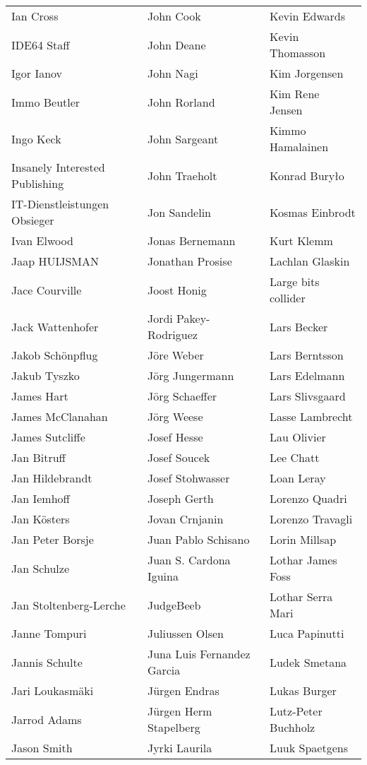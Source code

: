 \begin{tabular}{p{4.5cm}p{4.5cm}p{4.5cm}}
Ian Cross & John Cook & Kevin Edwards \\
IDE64 Staff & John Deane & Kevin Thomasson \\
Igor Ianov & John Nagi & Kim Jorgensen \\
Immo Beutler & John Rorland & Kim Rene Jensen \\
Ingo Keck & John Sargeant & Kimmo Hamalainen \\
Insanely Interested Publishing & John Traeholt & Konrad Buryło \\
IT-Dienstleistungen Obsieger & Jon Sandelin & Kosmas Einbrodt \\
Ivan Elwood & Jonas Bernemann & Kurt Klemm \\
Jaap HUIJSMAN & Jonathan Prosise & Lachlan Glaskin \\
Jace Courville & Joost Honig & Large bits collider \\
Jack Wattenhofer & Jordi Pakey-Rodriguez & Lars Becker \\
Jakob Schönpflug & Jöre Weber & Lars Berntsson \\
Jakub Tyszko & Jörg Jungermann & Lars Edelmann \\
James Hart & Jörg Schaeffer & Lars Slivsgaard \\
James McClanahan & Jörg Weese & Lasse Lambrecht \\
James Sutcliffe & Josef Hesse & Lau Olivier \\
Jan Bitruff & Josef Soucek & Lee Chatt \\
Jan Hildebrandt & Josef Stohwasser & Loan Leray \\
Jan Iemhoff & Joseph Gerth & Lorenzo Quadri \\
Jan Kösters & Jovan Crnjanin & Lorenzo Travagli \\
Jan Peter Borsje & Juan Pablo Schisano & Lorin Millsap \\
Jan Schulze & Juan S. Cardona Iguina & Lothar James Foss \\
Jan Stoltenberg-Lerche & JudgeBeeb & Lothar Serra Mari \\
Janne Tompuri & Juliussen Olsen & Luca Papinutti \\
Jannis Schulte & Juna Luis Fernandez Garcia & Ludek Smetana \\
Jari Loukasmäki & Jürgen Endras & Lukas Burger \\
Jarrod Adams & Jürgen Herm Stapelberg & Lutz-Peter Buchholz \\
Jason Smith & Jyrki Laurila & Luuk Spaetgens \\

\end{tabular}

